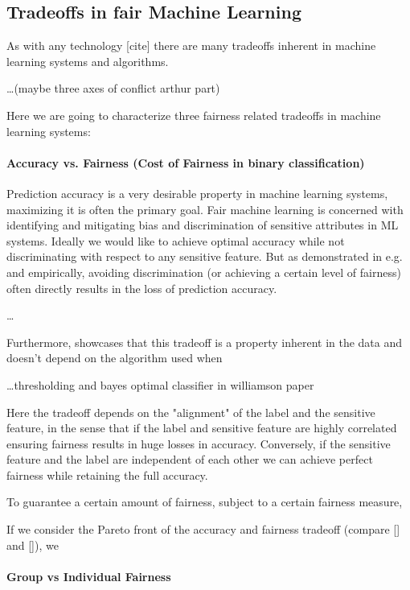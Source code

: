 	\subsection{Tradeoffs in fair Machine Learning}
	As with any technology [cite] there are many tradeoffs inherent in machine learning systems and algorithms.

	\dots (maybe three axes of conflict arthur part)

	Here we are going to characterize three fairness related tradeoffs in machine learning systems:
	
	\paragraph{Accuracy vs. Fairness (Cost of Fairness in binary classification)}
	Prediction accuracy is a very desirable property in machine learning systems, maximizing it is often the primary goal.
	Fair machine learning is concerned with identifying and mitigating bias and discrimination of sensitive attributes in ML systems.
	Ideally we would like to achieve optimal accuracy while not discriminating with respect to any sensitive feature.
	But as demonstrated in e.g. \cite{kamiran2010discrimination} and \cite{zliobaite2015relation} empirically, avoiding discrimination (or achieving a certain level of fairness) often directly results in the loss of prediction accuracy.
	
	\dots


	Furthermore, \cite{menon2018cost} showcases that this tradeoff is a property inherent in the data and doesn't depend on the algorithm used when 
	
	\dots thresholding and bayes optimal classifier in williamson paper

	Here the tradeoff depends on the "alignment" of the label and the sensitive feature, in the sense that if the label and sensitive feature are highly correlated ensuring fairness results in huge losses in accuracy.
	Conversely, if the sensitive feature and the label are independent of each other we can achieve perfect fairness while retaining the full accuracy.
	
	To guarantee a certain amount of fairness, subject to a certain fairness measure,  	

	If we consider the Pareto front of the accuracy and fairness tradeoff (compare [] and []), we 


	\paragraph{Group vs Individual Fairness}
	
